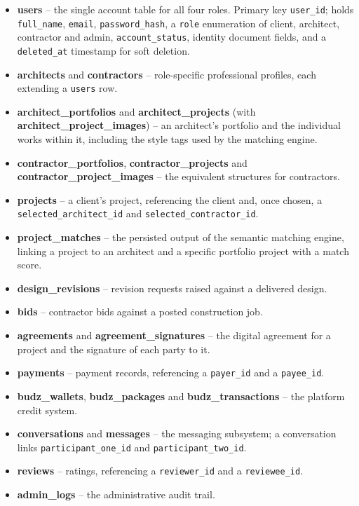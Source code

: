 \begin{itemize}[leftmargin=*, itemsep=1pt]
  \item \textbf{users} -- the single account table for all four roles.
        Primary key \texttt{user\_id}; holds \texttt{full\_name},
        \texttt{email}, \texttt{password\_hash}, a \texttt{role}
        enumeration of client, architect, contractor and admin,
        \texttt{account\_status}, identity document fields, and a
        \texttt{deleted\_at} timestamp for soft deletion.
  \item \textbf{architects} and \textbf{contractors} -- role-specific
        professional profiles, each extending a \texttt{users} row.
  \item \textbf{architect\_portfolios} and \textbf{architect\_projects}
        (with \textbf{architect\_project\_images}) -- an architect's
        portfolio and the individual works within it, including the
        style tags used by the matching engine.
  \item \textbf{contractor\_portfolios}, \textbf{contractor\_projects}
        and \textbf{contractor\_project\_images} -- the equivalent
        structures for contractors.
  \item \textbf{projects} -- a client's project, referencing the client
        and, once chosen, a \texttt{selected\_architect\_id} and
        \texttt{selected\_contractor\_id}.
  \item \textbf{project\_matches} -- the persisted output of the
        semantic matching engine, linking a project to an architect and
        a specific portfolio project with a match score.
  \item \textbf{design\_revisions} -- revision requests raised against a
        delivered design.
  \item \textbf{bids} -- contractor bids against a posted construction
        job.
  \item \textbf{agreements} and \textbf{agreement\_signatures} -- the
        digital agreement for a project and the signature of each party
        to it.
  \item \textbf{payments} -- payment records, referencing a
        \texttt{payer\_id} and a \texttt{payee\_id}.
  \item \textbf{budz\_wallets}, \textbf{budz\_packages} and
        \textbf{budz\_transactions} -- the platform credit system.
  \item \textbf{conversations} and \textbf{messages} -- the messaging
        subsystem; a conversation links
        \texttt{participant\_one\_id} and
        \texttt{participant\_two\_id}.
  \item \textbf{reviews} -- ratings, referencing a
        \texttt{reviewer\_id} and a \texttt{reviewee\_id}.
  \item \textbf{admin\_logs} -- the administrative audit trail.
\end{itemize}

